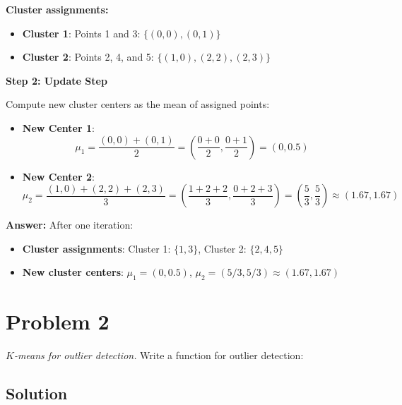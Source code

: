 \documentclass[11pt]{article}
\begin{document}
\textbf{Cluster assignments:}
\begin{itemize}
\item \textbf{Cluster 1}: Points 1 and 3: $\{(0,0), (0,1)\}$
\item \textbf{Cluster 2}: Points 2, 4, and 5: $\{(1,0), (2,2), (2,3)\}$
\end{itemize}

\textbf{Step 2: Update Step}

Compute new cluster centers as the mean of assigned points:

\begin{itemize}
\item \textbf{New Center 1}: 
  \[
  \mu_1 = \frac{(0,0) + (0,1)}{2} = \left(\frac{0+0}{2}, \frac{0+1}{2}\right) = (0, 0.5)
  \]

\item \textbf{New Center 2}: 
  \[
  \mu_2 = \frac{(1,0) + (2,2) + (2,3)}{3} = \left(\frac{1+2+2}{3}, \frac{0+2+3}{3}\right) = \left(\frac{5}{3}, \frac{5}{3}\right) \approx (1.67, 1.67)
  \]
\end{itemize}

\textbf{Answer:} After one iteration:
\begin{itemize}
\item \textbf{Cluster assignments}: Cluster 1: $\{1, 3\}$, Cluster 2: $\{2, 4, 5\}$
\item \textbf{New cluster centers}: $\mu_1 = (0, 0.5)$, $\mu_2 = (5/3, 5/3) \approx (1.67, 1.67)$
\end{itemize}

\newpage

\section*{Problem 2}

\emph{$K$-means for outlier detection.} Write a function for outlier detection:

\subsection*{Solution}
\end{document}
